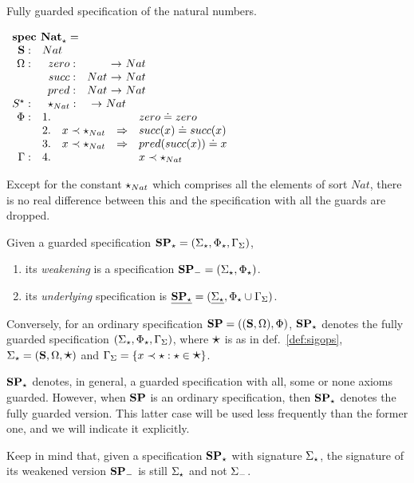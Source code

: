 \begin{example}\label{ex:Nat}
Fully guarded specification of the natural numbers.

\( 
	\spec{
	\tit{\mbox{\bf spec\ Nat}_\cons^{{}}=} \\
		\spSort{Nat}
		\spOp{ zero: && Nat\\
			succ: & Nat & Nat\\
			 pred: &Nat & Nat}
		\spOps{\allcons}{ \cons_{Nat}: && Nat }
		\Phi:
			&1.& && zero \eleq zero \\
			&2.& x \prec \cons_{Nat} & \To & succ(x) \eleq succ(x)\\
			&3.& x \prec \cons_{Nat} & \To & pred(succ(x)) \eleq x\\
		\Gamma:	&4.& && x \prec \cons_{Nat}\\
	}
\)
\end{example}
Except for the constant $\star_{Nat}$ which
comprises all the elements of sort $Nat$, 
there is no real difference between this and the 
specification with all the guards are dropped.

\begin{definition}\label{def:specOps}
Given a guarded specification ${\bf SP_\star}
= (\Sigma_\star,\Phi_\star,\Gamma_{\Sigma})$, 
\begin{enumerate}\MyLPar
\item its {\em weakening} is a
specification ${\bf SP_-} = (\Sigma_\star,\Phi_\star)$.
\item its {\em underlying} specification is $\underline{{\bf SP_\star}} = (\underline{\Sigma_\star},
\Phi_\star \cup \Gamma_\Sigma)$.
\end{enumerate}
Conversely, for an ordinary specification ${\bf SP}=(({\bf S},\Omega),\Phi)$,
${\bf SP_\star}$ denotes the fully guarded specification
$(\Sigma_\star,\Phi_\star,\Gamma_{\Sigma})$, where $\mbox{\Large{$\star$}}$ is as in
def.~\ref{def:sigops}, 
$\Sigma_\star=({\bf S},\Omega,\mbox{\Large{$\star$}})$ and
$\Gamma_\Sigma=\{x\prec \star:\star\in\mbox{\Large{$\star$}}\}$.
\end{definition}
% 
${\bf SP}_\star$ denotes, in general, a guarded specification with all,
some or none axioms guarded. However, when ${\bf SP}$ is an ordinary specification,
then ${\bf SP_\star}$ denotes the fully guarded version. This latter case will be
used less frequently than the former one, and we will indicate it explicitly.

Keep in mind that, given a specification ${\bf SP_\star}$ with signature
$\Sigma_\star$, the signature of its weakened version ${\bf SP_-}$ is
still $\Sigma_\star$ and not $\Sigma_-$.

